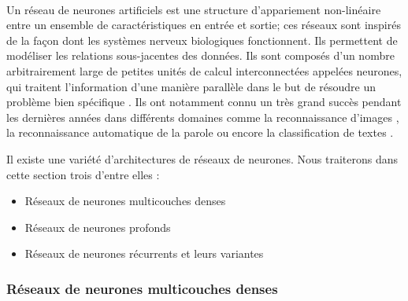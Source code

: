 \paragraph{}
Un réseau de neurones artificiels est une structure d'appariement non-linéaire entre un ensemble de caractéristiques en entrée et sortie; ces réseaux sont inspirés de la façon dont les systèmes nerveux biologiques fonctionnent. Ils permettent de modéliser les relations sous-jacentes des données. Ils sont composés d'un nombre arbitrairement large de petites unités de calcul interconnectées appelées neurones, qui traitent l'information d'une manière parallèle dans le but de résoudre un problème bien spécifique \citep{neural_nets}. Ils ont notamment connu un très grand succès pendant les dernières années dans différents domaines comme la reconnaissance d'images \citep{inception}, la reconnaissance automatique de la parole \citep{speech_reco_dnn,speech_reco_Yu2015} ou encore la classification de textes \citep{seq2seq_multitask_classification,dnn_text_classification}.
\par 
Il existe une variété d'architectures de réseaux de neurones. Nous traiterons dans cette section trois d'entre elles : 
\begin{itemize}
	\item Réseaux de neurones multicouches denses
	\item Réseaux de neurones profonds
	\item Réseaux de neurones récurrents et leurs variantes
\end{itemize}
\subsubsection{Réseaux de neurones multicouches denses}

